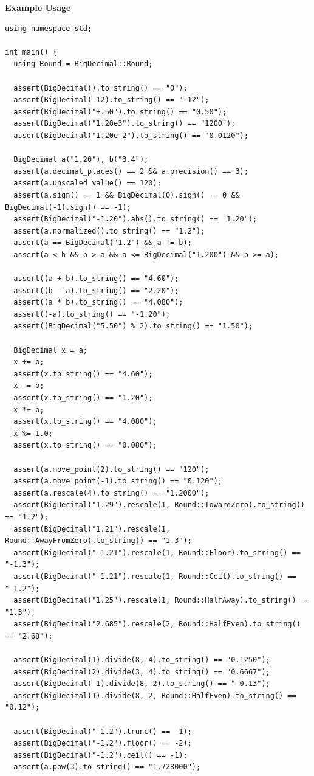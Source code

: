 \textbf{Example Usage}\par
\begin{lstlisting}[style=cpp]
using namespace std;

int main() {
  using Round = BigDecimal::Round;

  assert(BigDecimal().to_string() == "0");
  assert(BigDecimal(-12).to_string() == "-12");
  assert(BigDecimal("+.50").to_string() == "0.50");
  assert(BigDecimal("1.20e3").to_string() == "1200");
  assert(BigDecimal("1.20e-2").to_string() == "0.0120");

  BigDecimal a("1.20"), b("3.4");
  assert(a.decimal_places() == 2 && a.precision() == 3);
  assert(a.unscaled_value() == 120);
  assert(a.sign() == 1 && BigDecimal(0).sign() == 0 && BigDecimal(-1).sign() == -1);
  assert(BigDecimal("-1.20").abs().to_string() == "1.20");
  assert(a.normalized().to_string() == "1.2");
  assert(a == BigDecimal("1.2") && a != b);
  assert(a < b && b > a && a <= BigDecimal("1.200") && b >= a);

  assert((a + b).to_string() == "4.60");
  assert((b - a).to_string() == "2.20");
  assert((a * b).to_string() == "4.080");
  assert((-a).to_string() == "-1.20");
  assert((BigDecimal("5.50") % 2).to_string() == "1.50");

  BigDecimal x = a;
  x += b;
  assert(x.to_string() == "4.60");
  x -= b;
  assert(x.to_string() == "1.20");
  x *= b;
  assert(x.to_string() == "4.080");
  x %= 1.0;
  assert(x.to_string() == "0.080");

  assert(a.move_point(2).to_string() == "120");
  assert(a.move_point(-1).to_string() == "0.120");
  assert(a.rescale(4).to_string() == "1.2000");
  assert(BigDecimal("1.29").rescale(1, Round::TowardZero).to_string() == "1.2");
  assert(BigDecimal("1.21").rescale(1, Round::AwayFromZero).to_string() == "1.3");
  assert(BigDecimal("-1.21").rescale(1, Round::Floor).to_string() == "-1.3");
  assert(BigDecimal("-1.21").rescale(1, Round::Ceil).to_string() == "-1.2");
  assert(BigDecimal("1.25").rescale(1, Round::HalfAway).to_string() == "1.3");
  assert(BigDecimal("2.685").rescale(2, Round::HalfEven).to_string() == "2.68");

  assert(BigDecimal(1).divide(8, 4).to_string() == "0.1250");
  assert(BigDecimal(2).divide(3, 4).to_string() == "0.6667");
  assert(BigDecimal(-1).divide(8, 2).to_string() == "-0.13");
  assert(BigDecimal(1).divide(8, 2, Round::HalfEven).to_string() == "0.12");

  assert(BigDecimal("-1.2").trunc() == -1);
  assert(BigDecimal("-1.2").floor() == -2);
  assert(BigDecimal("-1.2").ceil() == -1);
  assert(a.pow(3).to_string() == "1.728000");


\end{lstlisting}
